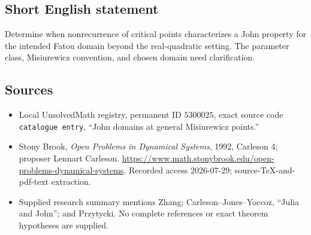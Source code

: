 \documentclass[11pt]{article}
\begin{document}
\subsection{Short English statement}
Determine when nonrecurrence of critical points characterizes a John property for the intended Fatou domain beyond the real-quadratic setting. The parameter class, Misiurewicz convention, and chosen domain need clarification.
\subsection{Sources}
\begin{itemize}
\item Local UnsolvedMath registry, permanent ID \(5300025\), exact source code \texttt{catalogue entry}, ``John domains at general Misiurewicz points.''
\item Stony Brook, \emph{Open Problems in Dynamical Systems}, 1992, Carleson 4; proposer Lennart Carleson. \url{https://www.math.stonybrook.edu/open-problems-dynamical-systems}. Recorded access 2026-07-29; source-TeX-and-pdf-text extraction.
\item Supplied research summary mentions Zhang; Carleson--Jones--Yoccoz, ``Julia and John''; and Przytycki. No complete references or exact theorem hypotheses are supplied.
\end{itemize}
\end{document}
